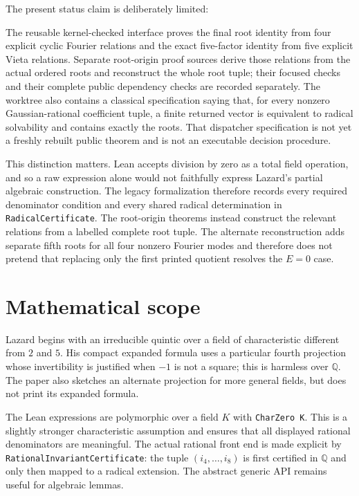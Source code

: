 \documentclass[11pt,a4paper,oneside]{article}
\newcommand{\lean}[1]{\nolinkurl{#1}}
\newcommand{\Q}{\mathbb{Q}}
\newcommand{\ii}[1]{i_{#1}}
\begin{document}
The present status claim is deliberately limited:

\begin{statusbox}
The reusable kernel-checked interface proves the final root identity from four
explicit cyclic Fourier relations and the exact five-factor identity from five
explicit Vieta relations.  Separate root-origin proof sources derive those
relations from the actual ordered roots and reconstruct the whole root tuple;
their focused checks and their complete public dependency checks are recorded
separately.  The worktree also contains a classical specification saying that,
for every nonzero Gaussian-rational coefficient tuple, a finite returned vector
is equivalent to radical solvability and contains exactly the roots.  That
dispatcher specification is not yet a freshly rebuilt public theorem and is
not an executable decision procedure.
\end{statusbox}

This distinction matters.  Lean accepts division by zero as a total field
operation, and so a raw expression alone would not faithfully express
Lazard's partial algebraic construction.  The legacy formalization therefore
records every required denominator condition and every shared radical
determination in \lean{RadicalCertificate}.  The root-origin theorems instead
construct the relevant relations from a labelled complete root tuple.  The
alternate reconstruction adds separate fifth roots for all four nonzero
Fourier modes and therefore does not pretend that replacing only the first
printed quotient resolves the $E=0$ case.

\section{Mathematical scope}

Lazard begins with an irreducible quintic over a field of characteristic
different from $2$ and $5$.  His compact expanded formula uses a particular
fourth projection whose invertibility is justified when $-1$ is not a square;
this is harmless over $\Q$.  The paper also sketches an alternate projection
for more general fields, but does not print its expanded formula.

The Lean expressions are polymorphic over a field $K$ with
\lean{CharZero K}.  This is a slightly stronger characteristic assumption and
ensures that all displayed rational denominators are meaningful.  The actual
rational front end is made explicit by
\lean{RationalInvariantCertificate}: the tuple
$(\ii4,\ldots,\ii8)$ is first certified in $\Q$ and only then mapped to a
radical extension.  The abstract generic API remains useful for algebraic
lemmas.
\end{document}
